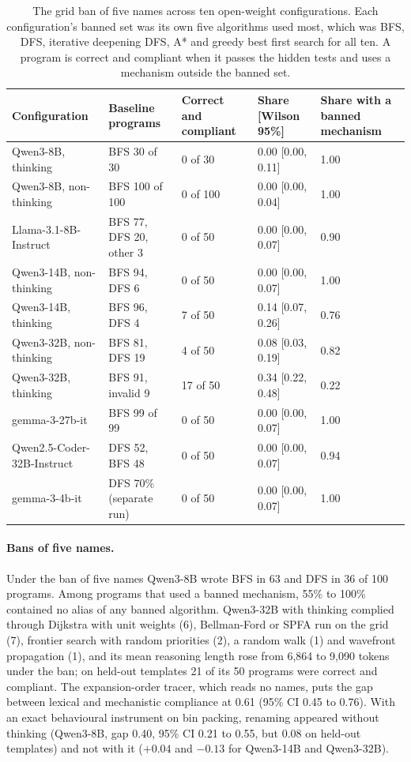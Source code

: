 \documentclass[11pt,letterpaper]{article}
\begin{document}
\begin{table}[!htbp]
\centering
\footnotesize
\caption{The grid ban of five names across ten open-weight configurations. Each configuration's banned set was its own five algorithms used most, which was BFS, DFS, iterative deepening DFS, A* and greedy best first search for all ten. A program is correct and compliant when it passes the hidden tests and uses a mechanism outside the banned set.}
\label{tab:fivename}
\begin{tabularx}{\linewidth}{@{}YL{3.9cm}L{1.8cm}L{2.4cm}L{1.8cm}@{}}
\toprule
Configuration & Baseline programs & Correct and compliant & Share [Wilson 95\%] & Share with a banned mechanism \\
\midrule
Qwen3-8B, thinking & BFS 30 of 30 & 0 of 30 & 0.00 [0.00, 0.11] & 1.00 \\
Qwen3-8B, non-thinking & BFS 100 of 100 & 0 of 100 & 0.00 [0.00, 0.04] & 1.00 \\
Llama-3.1-8B-Instruct & BFS 77, DFS 20, other 3 & 0 of 50 & 0.00 [0.00, 0.07] & 0.90 \\
Qwen3-14B, non-thinking & BFS 94, DFS 6 & 0 of 50 & 0.00 [0.00, 0.07] & 1.00 \\
Qwen3-14B, thinking & BFS 96, DFS 4 & 7 of 50 & 0.14 [0.07, 0.26] & 0.76 \\
Qwen3-32B, non-thinking & BFS 81, DFS 19 & 4 of 50 & 0.08 [0.03, 0.19] & 0.82 \\
Qwen3-32B, thinking & BFS 91, invalid 9 & 17 of 50 & 0.34 [0.22, 0.48] & 0.22 \\
gemma-3-27b-it & BFS 99 of 99 & 0 of 50 & 0.00 [0.00, 0.07] & 1.00 \\
Qwen2.5-Coder-32B-Instruct & DFS 52, BFS 48 & 0 of 50 & 0.00 [0.00, 0.07] & 0.94 \\
gemma-3-4b-it & DFS 70\% (separate run) & 0 of 50 & 0.00 [0.00, 0.07] & 1.00 \\
\bottomrule
\end{tabularx}
\end{table}

\paragraph{Bans of five names.} Under the ban of five names Qwen3-8B wrote BFS in 63 and DFS in 36 of 100 programs. Among programs that used a banned mechanism, 55\% to 100\% contained no alias of any banned algorithm. Qwen3-32B with thinking complied through Dijkstra with unit weights (6), Bellman-Ford or SPFA run on the grid (7), frontier search with random priorities (2), a random walk (1) and wavefront propagation (1), and its mean reasoning length rose from 6,864 to 9,090 tokens under the ban; on held-out templates 21 of its 50 programs were correct and compliant. The expansion-order tracer, which reads no names, puts the gap between lexical and mechanistic compliance at 0.61 (95\% CI 0.45 to 0.76). With an exact behavioural instrument on bin packing, renaming appeared without thinking (Qwen3-8B, gap 0.40, 95\% CI 0.21 to 0.55, but 0.08 on held-out templates) and not with it ($+0.04$ and $-0.13$ for Qwen3-14B and Qwen3-32B).
\end{document}
